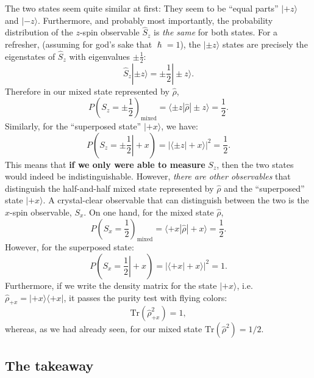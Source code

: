 \documentclass[a4]{article}
\begin{document}
The two states seem quite similar at first: They seem to be ``equal parts'' $|+z\rangle$
and $|-z\rangle$. Furthermore, and probably most importantly, the probability distribution of the $z$-spin observable $\hat{S}_z$
is \textit{the same} for both states. For a refresher, (assuming for god's sake that $\hslash = 1$), the $|\pm z\rangle$
states are precisely the eigenstates of $\hat{S}_z$ with eigenvalues $\pm\frac{1}{2}$:
\begin{equation*}
  \hat{S}_z|\pm z\rangle = \pm\frac{1}{2}|\pm z\rangle.
\end{equation*}
Therefore in our mixed state represented by $\hat{\rho}$,
\begin{equation*}
  P\left(S_z = \pm\frac{1}{2}\right)_{\text{mixed}} = \langle \pm z | \hat{\rho} | \pm z\rangle = \frac{1}{2}.
\end{equation*}
Similarly, for the ``superposed state'' $|+x\rangle$, we have:
\begin{equation*}
  P\left(S_z = \pm \left.\frac{1}{2} \right| +x \right) = |\langle \pm z | +x \rangle|^2 = \frac{1}{2}.
\end{equation*}
This means that \textbf{if we only were able to measure} $S_z$, then the two states would indeed be indistinguishable. However, \textit{there are other observables}
that distinguish the half-and-half mixed state represented by $\hat{\rho}$ and the ``superposed'' state $|+x\rangle$. A crystal-clear observable that can distinguish between the two is the $x$-spin observable,
$S_x$. On one hand, for the mixed state $\hat{\rho}$,
\begin{equation*}
  P\left(S_x = \frac{1}{2}\right)_{\text{mixed}} = \langle +x |\hat{\rho} | +x \rangle = \frac{1}{2}.
\end{equation*}
However, for the superposed state:
\begin{equation*}
  P\left(S_x = \left.\frac{1}{2} \right| +x \right) = |\langle +x | +x \rangle|^2 = 1.
\end{equation*}
Furthermore, if we write the density matrix for the state $|+x\rangle$, i.e. $\hat{\rho}_{+x}=|+x\rangle\langle +x|$,
it passes the purity test with flying colors:
\begin{equation*}
  \mathrm{Tr}\left(\hat{\rho}_{+x}^2\right) = 1,
\end{equation*}
whereas, as  we had already seen, for our mixed state $\mathrm{Tr}(\hat{\rho}^2)=1/2$.

\subsection{The takeaway}\label{the-takeaway}
\end{document}
